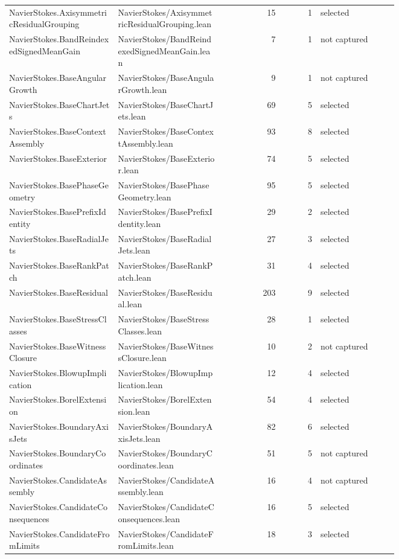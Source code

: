 \documentclass[10pt]{article}
\begin{document}
\begin{longtable}{p{0.28\linewidth}p{0.27\linewidth}r r p{0.20\linewidth}}
NavierStokes.AxisymmetricResidualGrouping & NavierStokes/AxisymmetricResidualGrouping.lean & 15 & 1 & selected\\
NavierStokes.BandReindexedSignedMeanGain & NavierStokes/BandReindexedSignedMeanGain.lean & 7 & 1 & not captured\\
NavierStokes.BaseAngularGrowth & NavierStokes/BaseAngularGrowth.lean & 9 & 1 & not captured\\
NavierStokes.BaseChartJets & NavierStokes/BaseChartJets.lean & 69 & 5 & selected\\
NavierStokes.BaseContextAssembly & NavierStokes/BaseContextAssembly.lean & 93 & 8 & selected\\
NavierStokes.BaseExterior & NavierStokes/BaseExterior.lean & 74 & 5 & selected\\
NavierStokes.BasePhaseGeometry & NavierStokes/BasePhaseGeometry.lean & 95 & 5 & selected\\
NavierStokes.BasePrefixIdentity & NavierStokes/BasePrefixIdentity.lean & 29 & 2 & selected\\
NavierStokes.BaseRadialJets & NavierStokes/BaseRadialJets.lean & 27 & 3 & selected\\
NavierStokes.BaseRankPatch & NavierStokes/BaseRankPatch.lean & 31 & 4 & selected\\
NavierStokes.BaseResidual & NavierStokes/BaseResidual.lean & 203 & 9 & selected\\
NavierStokes.BaseStressClasses & NavierStokes/BaseStressClasses.lean & 28 & 1 & selected\\
NavierStokes.BaseWitnessClosure & NavierStokes/BaseWitnessClosure.lean & 10 & 2 & not captured\\
NavierStokes.BlowupImplication & NavierStokes/BlowupImplication.lean & 12 & 4 & selected\\
NavierStokes.BorelExtension & NavierStokes/BorelExtension.lean & 54 & 4 & selected\\
NavierStokes.BoundaryAxisJets & NavierStokes/BoundaryAxisJets.lean & 82 & 6 & selected\\
NavierStokes.BoundaryCoordinates & NavierStokes/BoundaryCoordinates.lean & 51 & 5 & not captured\\
NavierStokes.CandidateAssembly & NavierStokes/CandidateAssembly.lean & 16 & 4 & not captured\\
NavierStokes.CandidateConsequences & NavierStokes/CandidateConsequences.lean & 16 & 5 & selected\\
NavierStokes.CandidateFromLimits & NavierStokes/CandidateFromLimits.lean & 18 & 3 & selected\\

\end{longtable}
\end{document}
